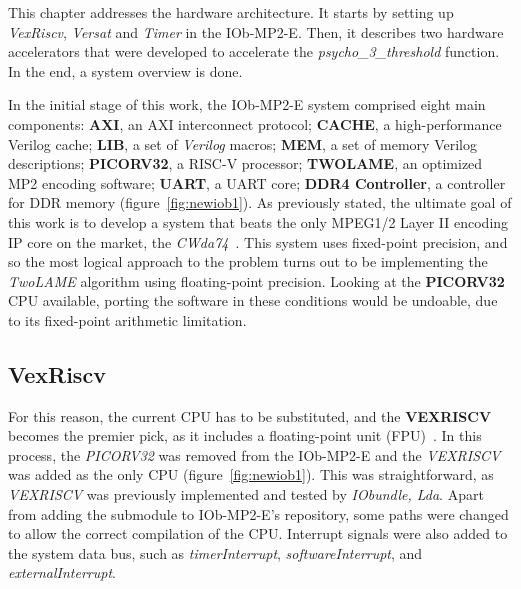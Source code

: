 This chapter addresses the hardware architecture. It starts by setting up \textit{VexRiscv}, \textit{Versat} and \textit{Timer} in the IOb-MP2-E. Then, it describes two hardware accelerators that were developed to accelerate the \textit{psycho\_3\_threshold} function. In the end, a system overview is done.

In the initial stage of this work, the IOb-MP2-E system comprised eight main components: \textbf{AXI}, an AXI interconnect protocol;
\textbf{CACHE}, a high-performance Verilog cache; \textbf{LIB}, a set of \textit{Verilog} macros; \textbf{MEM}, a set of memory Verilog descriptions; \textbf{PICORV32}, a RISC-V processor; \textbf{TWOLAME}, an optimized MP2 encoding software; \textbf{UART}, a UART core; \textbf{DDR4 Controller}, a controller for DDR memory (figure~\ref{fig:newiob1}).
As previously stated, the ultimate goal of this work is to develop a system that beats the only MPEG1/2 Layer II encoding IP core on the market, the \textit{CWda74}~\cite{CWda74}. This system uses fixed-point precision, and so the most logical approach to the problem turns out to be implementing the \textit{TwoLAME} algorithm using floating-point precision.  
Looking at the \textbf{PICORV32} CPU available, porting the software in these conditions would be undoable, due to its fixed-point arithmetic limitation.

\subsection{VexRiscv}

For this reason, the current CPU has to be substituted, and the \textbf{VEXRISCV} becomes the premier pick, as it includes a floating-point unit (FPU)~\cite{fpu}. In this process, the \textit{PICORV32} was removed from the IOb-MP2-E and the \textit{VEXRISCV} was added as the only CPU (figure~\ref{fig:newiob1}). This was straightforward, as \textit{VEXRISCV} was previously implemented and tested by \textit{IObundle, Lda}. Apart from adding the submodule to IOb-MP2-E's repository, some paths were changed to allow the correct compilation of the CPU. Interrupt signals were also added to the system data bus, such as \textit{timerInterrupt}, \textit{softwareInterrupt}, and \textit{externalInterrupt}. 


